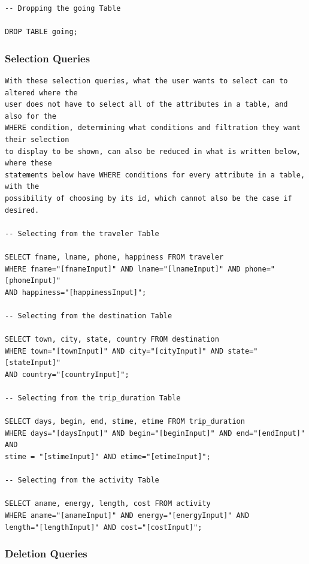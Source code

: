 \documentclass[letterpaper,10pt,onecolumn,compsoc]{IEEEtran}
\begin{document}
\newpage

\begin{verbatim}
-- Dropping the going Table

DROP TABLE going;
\end{verbatim}

\subsubsection{Selection Queries}

\begin{verbatim}
With these selection queries, what the user wants to select can to altered where the 
user does not have to select all of the attributes in a table, and also for the 
WHERE condition, determining what conditions and filtration they want their selection 
to display to be shown, can also be reduced in what is written below, where these 
statements below have WHERE conditions for every attribute in a table, with the 
possibility of choosing by its id, which cannot also be the case if desired.

-- Selecting from the traveler Table

SELECT fname, lname, phone, happiness FROM traveler 
WHERE fname="[fnameInput]" AND lname="[lnameInput]" AND phone="[phoneInput]" 
AND happiness="[happinessInput]";

-- Selecting from the destination Table

SELECT town, city, state, country FROM destination 
WHERE town="[townInput]" AND city="[cityInput]" AND state="[stateInput]" 
AND country="[countryInput]";

-- Selecting from the trip_duration Table

SELECT days, begin, end, stime, etime FROM trip_duration 
WHERE days="[daysInput]" AND begin="[beginInput]" AND end="[endInput]" AND 
stime = "[stimeInput]" AND etime="[etimeInput]";

-- Selecting from the activity Table

SELECT aname, energy, length, cost FROM activity 
WHERE aname="[anameInput]" AND energy="[energyInput]" AND
length="[lengthInput]" AND cost="[costInput]";
\end{verbatim}

\subsubsection{Deletion Queries}
\end{document}
